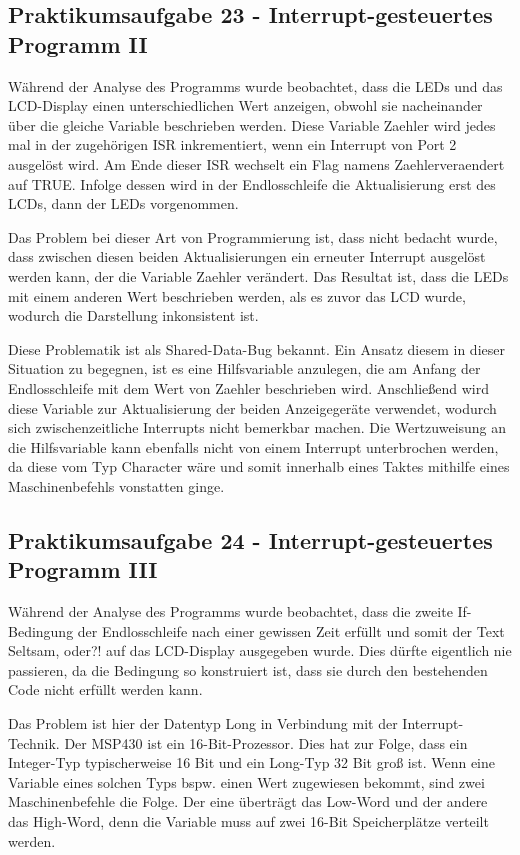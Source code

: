 \documentclass[12pt,a4paper,bibliography=totocnumbered,listof=totocnumbered]{scrartcl}
\begin{document}
\subsection{Praktikumsaufgabe 23 - Interrupt-gesteuertes Programm II}
Während der Analyse des Programms wurde beobachtet, dass die LEDs und das LCD-Display einen unterschiedlichen Wert anzeigen, obwohl sie nacheinander über die gleiche Variable beschrieben werden. Diese Variable \glqq Zaehler\grqq{} wird jedes mal in der zugehörigen ISR inkrementiert, wenn ein Interrupt von Port 2 ausgelöst wird. Am Ende dieser ISR wechselt ein Flag namens \glqq Zaehlerveraendert\grqq{} auf TRUE. Infolge dessen wird in der Endlosschleife die Aktualisierung erst des LCDs, dann der LEDs vorgenommen. 

Das Problem bei dieser Art von Programmierung ist, dass nicht bedacht wurde, dass zwischen diesen beiden Aktualisierungen ein erneuter Interrupt ausgelöst werden kann, der die Variable \glqq Zaehler\grqq{} verändert. 
Das Resultat ist, dass die LEDs mit einem anderen Wert beschrieben werden, als es zuvor das LCD wurde, wodurch die Darstellung inkonsistent ist. 

Diese Problematik ist als Shared-Data-Bug bekannt. Ein Ansatz diesem in dieser Situation zu begegnen, ist es eine Hilfsvariable anzulegen, die am Anfang der Endlosschleife mit dem Wert von \glqq Zaehler\grqq{} beschrieben wird. Anschließend wird diese Variable zur Aktualisierung der beiden Anzeigegeräte verwendet, wodurch sich zwischenzeitliche Interrupts nicht bemerkbar machen. Die Wertzuweisung an die Hilfsvariable kann ebenfalls nicht von einem Interrupt unterbrochen werden, da diese vom Typ Character wäre und somit innerhalb eines Taktes mithilfe eines Maschinenbefehls vonstatten ginge.


\subsection{Praktikumsaufgabe 24 - Interrupt-gesteuertes Programm III}
Während der Analyse des Programms wurde beobachtet, dass die zweite If-Bedingung der Endlosschleife nach einer gewissen Zeit erfüllt und somit der Text \glqq Seltsam, oder?!\grqq{} auf das LCD-Display ausgegeben wurde. Dies dürfte eigentlich nie passieren, da die Bedingung so konstruiert ist, dass sie durch den bestehenden Code nicht erfüllt werden kann.

Das Problem ist hier der Datentyp Long in Verbindung mit der Interrupt-Technik.
Der MSP430 ist ein 16-Bit-Prozessor. Dies hat zur Folge, dass ein Integer-Typ typischerweise 16 Bit und ein Long-Typ 32 Bit groß ist. Wenn eine Variable eines solchen Typs bspw. einen Wert zugewiesen bekommt, sind zwei Maschinenbefehle die Folge. Der eine überträgt das Low-Word und der andere das High-Word, denn die Variable muss auf zwei 16-Bit Speicherplätze verteilt werden.
\end{document}
